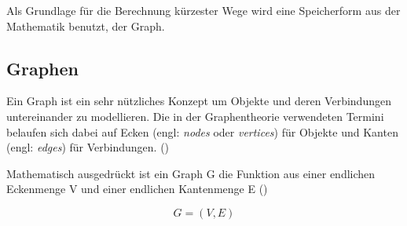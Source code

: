\documentclass[12pt,a4paper]{article}
\begin{document}
Als Grundlage für die Berechnung kürzester Wege wird eine Speicherform aus der Mathematik benutzt, der Graph. 

\subsection{Graphen}

Ein Graph ist ein sehr nützliches Konzept um Objekte und deren Verbindungen untereinander zu modellieren. Die in der Graphentheorie verwendeten Termini belaufen sich dabei auf Ecken (engl: \textit{nodes} oder \textit{vertices}) für Objekte und Kanten (engl: \textit{edges}) für Verbindungen.
(\cite[49]{kurt})

Mathematisch ausgedrückt ist ein Graph G die Funktion aus einer endlichen Eckenmenge V und einer endlichen Kantenmenge E (\cite[4]{theory})

	$$G = (V,E)$$
\end{document}
